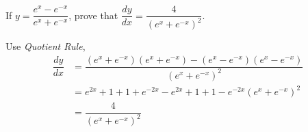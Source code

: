 

\question If $y=\dfrac{e^x - e^{-x}}{e^x + e^{-x}}$, prove that 
$\dfrac{dy}{dx}=\dfrac{4}{\left(e^x + e^{-x}\right)^2}$.

\begin{solution}
  Use \textit{Quotient Rule},
  \begin{align}
      \dfrac{dy}{dx}&=\dfrac{(e^x + e^{-x})(e^x + e^{-x})-
                             (e^x - e^{-x})(e^x - e^{-x})}
                            {(e^x + e^{-x})^2} \\
                    &={e^{2x}+1+1+e^{-2x}-e^{2x}+1+1-e^{-2x}}
                            {(e^x + e^{-x})^2} \\
                    &=\dfrac{4}{(e^x + e^{-x})^2}
  \end{align}
\end{solution}

